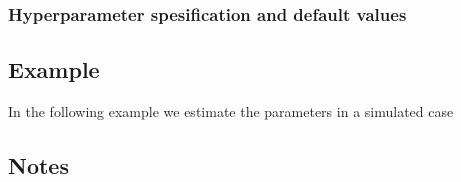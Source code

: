 \documentclass[a4paper,11pt]{article}
\begin{document}
\subsubsection*{Hyperparameter spesification and default values}




\subsection*{Example}

In the following example we estimate the parameters in a simulated
case%


\subsection*{Notes}
\end{document}
